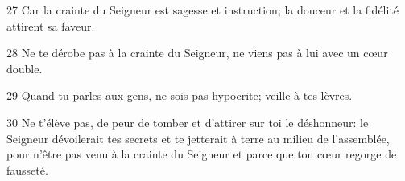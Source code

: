 
27 Car la crainte du Seigneur est sagesse et instruction; la douceur et la fidélité attirent sa faveur.

28 Ne te dérobe pas à la crainte du Seigneur, ne viens pas à lui avec un cœur double.

29 Quand tu parles aux gens, ne sois pas hypocrite; veille à tes lèvres.

30 Ne t’élève pas, de peur de tomber et d’attirer sur toi le déshonneur: le Seigneur dévoilerait tes secrets et te jetterait à terre au milieu de l’assemblée, pour n’être pas venu à la crainte du Seigneur et parce que ton cœur regorge de fausseté.